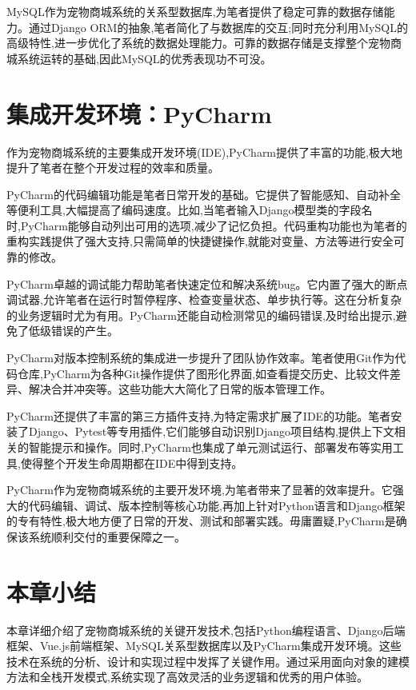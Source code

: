 MySQL作为宠物商城系统的关系型数据库,为笔者提供了稳定可靠的数据存储能力。通过Django ORM的抽象,笔者简化了与数据库的交互;同时充分利用MySQL的高级特性,进一步优化了系统的数据处理能力。可靠的数据存储是支撑整个宠物商城系统运转的基础,因此MySQL的优秀表现功不可没。

\section{集成开发环境：PyCharm}
作为宠物商城系统的主要集成开发环境(IDE),PyCharm提供了丰富的功能,极大地提升了笔者在整个开发过程的效率和质量。

PyCharm的代码编辑功能是笔者日常开发的基础。它提供了智能感知、自动补全等便利工具,大幅提高了编码速度。比如,当笔者输入Django模型类的字段名时,PyCharm能够自动列出可用的选项,减少了记忆负担。代码重构功能也为笔者的重构实践提供了强大支持,只需简单的快捷键操作,就能对变量、方法等进行安全可靠的修改。

PyCharm卓越的调试能力帮助笔者快速定位和解决系统bug。它内置了强大的断点调试器,允许笔者在运行时暂停程序、检查变量状态、单步执行等。这在分析复杂的业务逻辑时尤为有用。PyCharm还能自动检测常见的编码错误,及时给出提示,避免了低级错误的产生。

PyCharm对版本控制系统的集成进一步提升了团队协作效率。笔者使用Git作为代码仓库,PyCharm为各种Git操作提供了图形化界面,如查看提交历史、比较文件差异、解决合并冲突等。这些功能大大简化了日常的版本管理工作。

PyCharm还提供了丰富的第三方插件支持,为特定需求扩展了IDE的功能。笔者安装了Django、Pytest等专用插件,它们能够自动识别Django项目结构,提供上下文相关的智能提示和操作。同时,PyCharm也集成了单元测试运行、部署发布等实用工具,使得整个开发生命周期都在IDE中得到支持。

PyCharm作为宠物商城系统的主要开发环境,为笔者带来了显著的效率提升。它强大的代码编辑、调试、版本控制等核心功能,再加上针对Python语言和Django框架的专有特性,极大地方便了日常的开发、测试和部署实践。毋庸置疑,PyCharm是确保该系统顺利交付的重要保障之一。

\section{本章小结}
本章详细介绍了宠物商城系统的关键开发技术,包括Python编程语言、Django后端框架、Vue.js前端框架、MySQL关系型数据库以及PyCharm集成开发环境。这些技术在系统的分析、设计和实现过程中发挥了关键作用。通过采用面向对象的建模方法和全栈开发模式,系统实现了高效灵活的业务逻辑和优秀的用户体验。